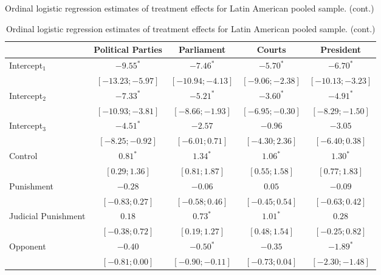 \begin{table}[h]
\begin{center}
\caption
*
{Ordinal logistic regression estimates of treatment effects for Latin American pooled sample. (cont.)}
\caption{Ordinal logistic regression estimates of treatment effects for Latin American pooled sample. (cont.)}
\begin{threeparttable}
\begin{tabular}{l c c c c}
\hline
 & Political Parties & Parliament & Courts & President \\
\hline
Intercept$_1$            & $-9.55^{*}$        & $-7.46^{*}$        & $-5.70^{*}$       & $-6.70^{*}$        \\
                         & $ [-13.23; -5.97]$ & $ [-10.94; -4.13]$ & $ [-9.06; -2.38]$ & $ [-10.13; -3.23]$ \\
Intercept$_2$            & $-7.33^{*}$        & $-5.21^{*}$        & $-3.60^{*}$       & $-4.91^{*}$        \\
                         & $ [-10.93; -3.81]$ & $ [ -8.66; -1.93]$ & $ [-6.95; -0.30]$ & $ [ -8.29; -1.50]$ \\
Intercept$_3$            & $-4.51^{*}$        & $-2.57$            & $-0.96$           & $-3.05$            \\
                         & $ [ -8.25; -0.92]$ & $ [ -6.01;  0.71]$ & $ [-4.30;  2.36]$ & $ [ -6.40;  0.38]$ \\
Control                  & $0.81^{*}$         & $1.34^{*}$         & $1.06^{*}$        & $1.30^{*}$         \\
                         & $ [  0.29;  1.36]$ & $ [  0.81;  1.87]$ & $ [ 0.55;  1.58]$ & $ [  0.77;  1.83]$ \\
Punishment               & $-0.28$            & $-0.06$            & $0.05$            & $-0.09$            \\
                         & $ [ -0.83;  0.27]$ & $ [ -0.58;  0.46]$ & $ [-0.45;  0.54]$ & $ [ -0.63;  0.42]$ \\
Judicial Punishment      & $0.18$             & $0.73^{*}$         & $1.01^{*}$        & $0.28$             \\
                         & $ [ -0.38;  0.72]$ & $ [  0.19;  1.27]$ & $ [ 0.48;  1.54]$ & $ [ -0.25;  0.82]$ \\
Opponent                 & $-0.40$            & $-0.50^{*}$        & $-0.35$           & $-1.89^{*}$        \\
                         & $ [ -0.81;  0.00]$ & $ [ -0.90; -0.11]$ & $ [-0.73;  0.04]$ & $ [ -2.30; -1.48]$ \\

\end{tabular}
\end{threeparttable}
\end{center}
\end{table}

